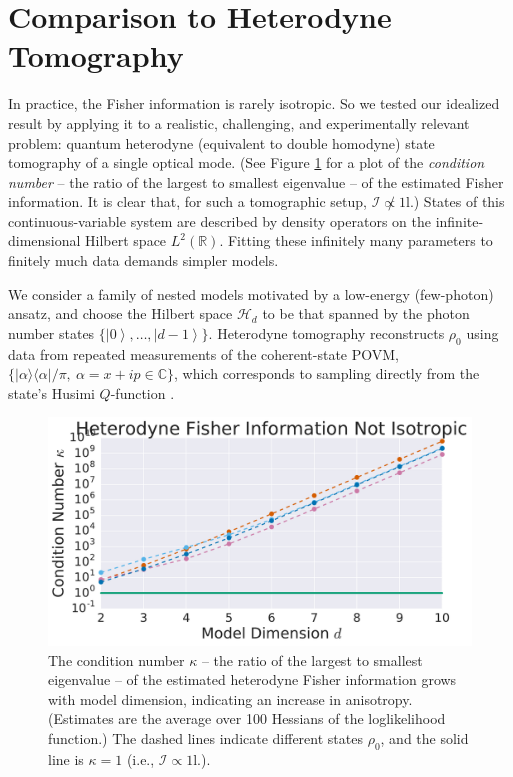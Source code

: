 \documentclass[aps,pra, twocolumn]{revtex4-1}
\newcommand{\reals}{\mathbb{R}}
\newcommand{\Id}{\mathbb{I}}
\newcommand{\ket}[1]{\ensuremath{\left|#1\right\rangle}}
\def\Id{1\!\mathrm{l}}
\begin{document}
\section{Comparison to Heterodyne Tomography}
In practice, the Fisher information is rarely isotropic.  So we tested our idealized result by applying it to a realistic, challenging, and experimentally relevant problem: quantum heterodyne (equivalent to double homodyne) state tomography \cite{Lvovsky2001a, Bertrand1987, Leonhardt1995, Lvovsky2009} of a single optical mode.  (See Figure \ref{fig:fish_condition} for a plot of the \emph{condition number} -- the ratio of the largest to smallest eigenvalue -- of the estimated Fisher information. It is clear that, for such a tomographic setup, $\mathcal{I} \not \propto \Id$.) States of this continuous-variable system are described by density operators on the infinite-dimensional Hilbert space $L^2(\reals)$.  Fitting these infinitely many parameters to finitely much data demands simpler models.

We consider a family of nested models motivated by a low-energy (few-photon) ansatz, and choose   
the Hilbert space $\mathcal{H}_d$ to be that spanned by the photon number states $\{\ket{0},\ldots ,\ket{d-1}\}$.
Heterodyne tomography reconstructs $\rho_{0}$ using data from repeated measurements of the 
coherent-state POVM, $\{|\alpha\rangle\langle \alpha| /\pi, ~\alpha=x+ip\in \mathbb{C}\}$, which corresponds to sampling directly from the 
state's Husimi $Q$-function \cite{Husimi1940}.

\begin{figure}[h]
  \includegraphics[width=\columnwidth]{Images/Figure_7.pdf}
 \caption{The condition number $\kappa$ -- the ratio of the largest to smallest eigenvalue -- of the estimated heterodyne Fisher information grows with model dimension, indicating an increase in anisotropy. (Estimates are the average over 100 Hessians of the loglikelihood function.) The dashed lines indicate different states $\rho_{0}$, and the solid line is $\kappa = 1$ (i.e., $\mathcal{I} \propto \Id$.).}
\label{fig:fish_condition}
\end{figure}
\end{document}
